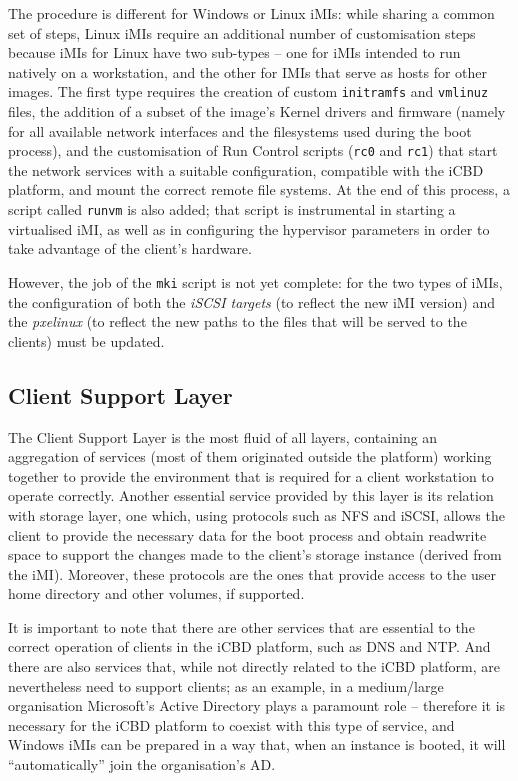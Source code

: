 The procedure is different for Windows or Linux iMIs: while sharing a common set of steps, Linux iMIs require an additional number of customisation steps because iMIs for Linux have two sub-types – one for iMIs intended to run natively on a workstation, and the other for IMIs that serve as hosts for other images. The first type requires the creation of custom \texttt{initramfs} and \texttt{vmlinuz} files, the addition of a subset of the image's Kernel drivers and firmware (namely for all available network interfaces and the filesystems used during the boot process), and the customisation of Run Control scripts (\texttt{rc0} and \texttt{rc1}) that start the network services with a suitable configuration, compatible with the iCBD platform, and mount the correct remote file systems. At the end of this process, a script called \texttt{runvm} is also added; that script is instrumental in starting a virtualised iMI, as well as in configuring the hypervisor parameters in order to take advantage of the client’s hardware.

However, the job of the \texttt{mki} script is not yet complete: for the two types of iMIs, the configuration of both the \textit{iSCSI targets} (to reflect the new iMI version) and the \textit{pxelinux} (to reflect the new paths to the files that will be served to the clients) must be updated.


\subsection{Client Support Layer}
\label{sub:icbd_client_support_layer}

The Client Support Layer is the most fluid of all layers, containing an aggregation of services (most of them originated outside the platform) working together to provide the environment that is required for a client workstation to operate correctly. Another essential service provided by this layer is its relation with storage layer, one which, using protocols such as NFS and iSCSI, allows the client to provide the necessary data for the boot process and obtain read\/write space to support the changes made to the client’s storage instance (derived from the iMI). Moreover, these protocols are the ones that provide access to the user home directory and other volumes, if supported.

It is important to note that there are other services that are essential to the correct operation of clients in the iCBD platform, such as DNS and NTP. And there are also services that, while not directly related to the iCBD platform, are nevertheless need to support clients; as an example, in a medium/large organisation Microsoft’s Active Directory plays a paramount role – therefore it is necessary for the iCBD platform to coexist with this type of service, and Windows iMIs can be prepared in a way that, when an instance is booted, it will “automatically” join the organisation’s AD.

